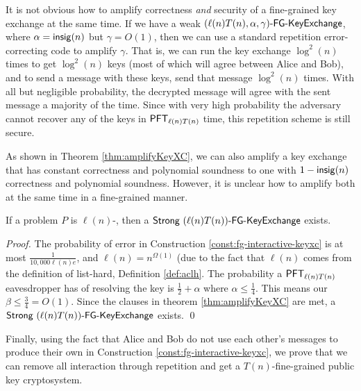 \begin{remark} It is not obvious how to amplify correctness \emph{and} security of a fine-grained key exchange at the same time. If we have a weak $(\ell(n)T(n), \alpha, \gamma)\textsf{-FG-KeyExchange}$, where $\alpha = \mathsf{insig}(n)$ but $\gamma = O(1)$, then we can use a standard repetition error-correcting code to amplify $\gamma$. That is, we can run the key exchange $\log^2(n)$ times to get $\log^2(n)$ keys (most of which will agree between Alice and Bob), and to send a message with these keys, send that message $\log^2(n)$ times. With all but negligible probability, the decrypted message will agree with the sent message a majority of the time.
Since with very high probability the adversary cannot recover any of the keys in $\mathsf{PFT}_{\ell(n)T(n)}$ time, this repetition scheme is still secure.

As shown in Theorem \ref{thm:amplifyKeyXC}, we can also amplify a key exchange that has constant correctness and polynomial soundness to one with $1 - \mathsf{insig}(n)$ correctness and polynomial soundness. However, it is unclear how to amplify both at the same time in a fine-grained manner.
\end{remark}

\begin{corollary}\label{cor:strongFGKeyXc}
	If a problem $P$ is $\ell(n)$-\keyER, then a $\textsf{Strong } (\ell(n)T(n))\textsf{-FG-KeyExchange}$ exists.
\end{corollary}
\begin{proof}
	The probability of error in Construction \ref{const:fg-interactive-keyxc} is at most $\frac{1}{10,000 \ell(n) e}$, and $\ell(n) = n^{\Omega(1)}$ (due to the fact that $\ell(n)$ comes from the definition of list-hard, Definition \ref{def:aclh}. The probability a $\mathsf{PFT}_{\ell(n)T(n)}$ eavesdropper has of resolving the key is $\frac 1 2 + \alpha$ where $\alpha\leq \frac 1 4$. This means our $\beta \leq \frac 3 4 = O(1)$. Since the clauses in theorem \ref{thm:amplifyKeyXC} are met, a $\textsf{Strong } (\ell(n)T(n))\textsf{-FG-KeyExchange}$ exists.
	\qed
\end{proof}

Finally, using the fact that Alice and Bob do not use each other's messages to produce their own in Construction \ref{const:fg-interactive-keyxc}, we prove that we can remove all interaction through repetition and get a $T(n)$-fine-grained public key cryptosystem.

